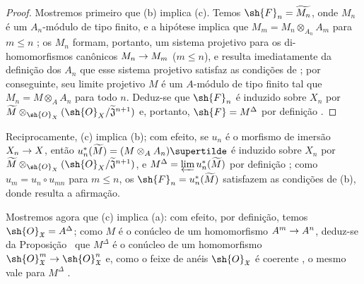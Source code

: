 \documentclass[oneside]{amsart}
\makeatletter
\renewcommand{\leq}{\leqslant}
\newcommand{\ega@arrow}[2]{\mathchoice{#1}{#2}{#2}{#2}}
\renewcommand{\to}{\ega@arrow{\longrightarrow}{\rightarrow}}
\newcommand{\oldpage}[2][]{{\marginnote{\normalfont\textbf{#1}~|~#2}}\ignorespaces}
\makeatother
\begin{document}
\begin{proof}
Mostremos primeiro que (b) implica (c).
Temos $\sh{F}_n=\widetilde{M_n}$, onde $M_n$ é um $A_n$-módulo de tipo finito, e a hipótese implica que $M_m=M_n\otimes_{A_n}A_m$ para $m\leq n$ ; os $M_n$ formam, portanto, um sistema projetivo para os di-homomorfismos canônicos $M_n\to M_m$ ($m\leq n$), e resulta imediatamente da definição dos $A_n$ que esse sistema projetivo satisfaz as condições de ; por conseguinte, seu limite projetivo $M$ é um $A$-módulo de tipo finito tal que $M_n=M\otimes_A A_n$ para todo $n$.
Deduz-se que $\sh{F}_n$ é induzido sobre $X_n$ por $\widetilde{M}\otimes_{\sh{O}_X}(\sh{O}_X/\widetilde{\mathfrak{J}}^{n+1})$ e, portanto, $\sh{F}=M^\Delta$ por definição .
\end{proof}

Reciprocamente, (c) implica (b); com efeito, se $u_n$ é o morfismo de imersão $X_n\to X$, então $u_n^*(\widetilde{M})=(M\otimes_A A_n)\supertilde$ é induzido sobre $X_n$ por $\widetilde{M}\otimes_{\sh{O}_X}(\sh{O}_X/\widetilde{\mathfrak{J}}^{n+1})$, e $M^\Delta=\varprojlim u_n^*(\widetilde{M})$ por definição ; como $u_m=u_n\circ u_{mn}$ para $m\leq n$, os $\sh{F}_n=u_n^*(\widetilde{M})$ satisfazem as condições de (b), donde resulta a afirmação.

Mostremos agora que (c) implica (a): com efeito, por definição, temos $\sh{O}_\mathfrak{X}=A^\Delta$; como $M$ é o conúcleo de um homomorfismo $A^m\to A^n$, deduz-se da Proposição~ que $M^\Delta$ é o conúcleo de um homomorfismo $\sh{O}_\mathfrak{X}^m\to\sh{O}_\mathfrak{X}^n$ e, como o feixe de anéis $\sh{O}_\mathfrak{X}$ é coerente , o mesmo vale para $M^\Delta$ .
\oldpage[I]{203}
\end{document}
